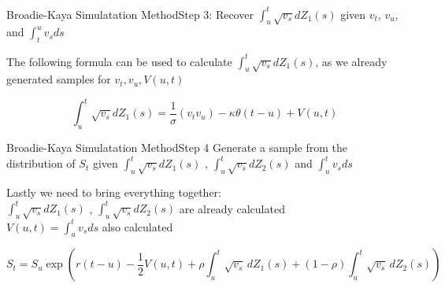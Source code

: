 \begin{frame}{Broadie-Kaya Simulatation Method}{Step 3: Recover $\int_{u}^t \sqrt{v_s} dZ_1(s)$ given $v_t$, $v_u$, and
        $\int_{t}^u v_s ds$}

    The following formula can be used to calculate $\int_{u}^t \sqrt{v_s} dZ_1(s)$, as we already generated samples for $v_t , v_u, V(u, t)$


    \begin{equation}
        \int_{u}^t \sqrt{v_s} dZ_1(s) = \frac{1}{\sigma}(v_t v_u) - \kappa\theta(t-u) + V(u, t)
    \end{equation}
    
    

    
\end{frame}





\begin{frame}{Broadie-Kaya Simulatation Method}{Step 4 Generate a sample from the distribution of $S_t$ given $\int_{u}^t \sqrt{v_s} dZ_1(s)$ , $\int_{u}^t \sqrt{v_s} dZ_2(s)$ and $\int_{u}^t v_s ds$}

    Lastly we need to bring everything together:\\
    $\int_{u}^t \sqrt{v_s} dZ_1(s)$ , $\int_{u}^t \sqrt{v_s} dZ_2(s)$ are already calculated \\
    $V(u, t) = \int_{u}^t v_s ds $ also calculated

    \begin{equation}
        S_t = S_u \exp{\left( r(t-u)-\frac{1}{2} V(u, t)  + \rho\int_{u}^{t} \sqrt{v_s} \, dZ_1(s) + (1-\rho)\int_{u}^{t} \sqrt{v_s} \, dZ_2(s)  \right)}
    \end{equation}

        
\end{frame}


